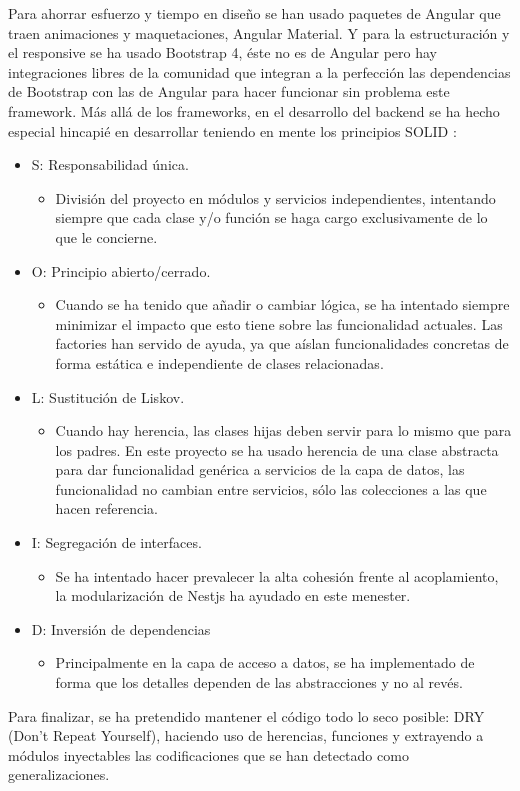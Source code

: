 \par Para ahorrar esfuerzo y tiempo en diseño se han usado paquetes de Angular que traen animaciones y maquetaciones, Angular Material. Y para la estructuración y el responsive se ha usado Bootstrap 4, éste no es de Angular pero hay integraciones libres de la comunidad que integran a la perfección las dependencias de Bootstrap con las de Angular para hacer funcionar sin problema este framework.
\clearpage
Más allá de los frameworks, en el desarrollo del backend se ha hecho especial hincapié en desarrollar teniendo en mente los principios SOLID \citep{SOLID}:
\begin{itemize}
    \item S: Responsabilidad única.
    \begin{itemize}
        \item División del proyecto en módulos y servicios independientes, intentando siempre que cada clase y/o función se haga cargo exclusivamente de lo que le concierne.
    \end{itemize}
    \item O: Principio abierto/cerrado.
    \begin{itemize}
        \item Cuando se ha tenido que añadir o cambiar lógica, se ha intentado siempre minimizar el impacto que esto tiene sobre las funcionalidad actuales. Las factories han servido de ayuda, ya que aíslan funcionalidades concretas de forma estática e independiente de clases relacionadas. 
    \end{itemize}
    \item L: Sustitución de Liskov.
    \begin{itemize}
        \item Cuando hay herencia, las clases hijas deben servir para lo mismo que para los padres. En este proyecto se ha usado herencia de una clase abstracta para dar funcionalidad genérica a servicios de la capa de datos, las funcionalidad no cambian entre servicios, sólo las colecciones a las que hacen referencia.
    \end{itemize}
    \item I: Segregación de interfaces.
    \begin{itemize}
        \item Se ha intentado hacer prevalecer la alta cohesión frente al acoplamiento, la modularización de Nestjs ha ayudado en este menester.
    \end{itemize}
    \item D: Inversión de dependencias
    \begin{itemize}
        \item Principalmente en la capa de acceso a datos, se ha implementado de forma que los detalles dependen de las abstracciones y no al revés.
    \end{itemize}
\end{itemize}
\vspace{1em}
\par Para finalizar, se ha pretendido mantener el código todo lo seco posible: DRY (Don't Repeat Yourself), haciendo uso de herencias, funciones y extrayendo a módulos inyectables las codificaciones que se han detectado como generalizaciones.


